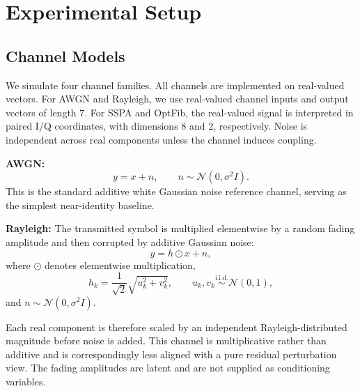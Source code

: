 \documentclass[conference]{IEEEtran}
\begin{document}

\section{Experimental Setup}
\subsection{Channel Models}
We simulate four channel families. All channels are implemented on real-valued vectors.
For AWGN and Rayleigh, we use real-valued channel inputs and output vectors of length \(7\).
For SSPA and OptFib, the real-valued signal is interpreted in paired I/Q coordinates, with dimensions \(8\) and \(2\), respectively.
Noise is independent across real components unless the channel induces coupling.

\textbf{AWGN:}
\begin{equation}
y = x + n,
\qquad
n \sim \mathcal{N}(0,\sigma^2 I).
\end{equation}
This is the standard additive white Gaussian noise reference channel, serving as the simplest near-identity baseline.

\textbf{Rayleigh:}
The transmitted symbol is multiplied elementwise by a random fading amplitude and then corrupted by additive Gaussian noise:
\begin{equation}
y = h \odot x + n,
\end{equation}
where \(\odot\) denotes elementwise multiplication,
\begin{equation}
h_k = \frac{1}{\sqrt{2}}\sqrt{u_k^2 + v_k^2},
\qquad
u_k,v_k \overset{\text{i.i.d.}}{\sim} \mathcal{N}(0,1),
\end{equation}
and $n \sim \mathcal{N}(0,\sigma^2 I).$

Each real component is therefore scaled by an independent Rayleigh-distributed magnitude before noise is added.
This channel is multiplicative rather than additive and is correspondingly less aligned with a pure residual perturbation view.
The fading amplitudes are latent and are not supplied as conditioning variables.
\end{document}

